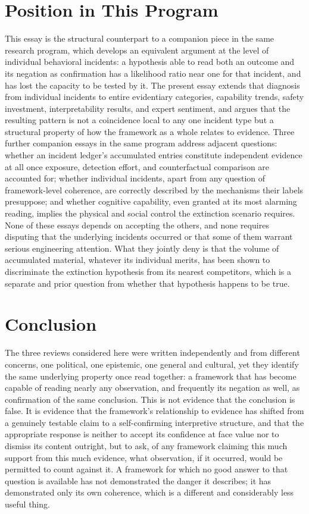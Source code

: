 \documentclass[11pt]{article}
\begin{document}
\section{Position in This Program}

This essay is the structural counterpart to a companion piece in the same research program, which develops an equivalent argument at the level of individual behavioral incidents: a hypothesis able to read both an outcome and its negation as confirmation has a likelihood ratio near one for that incident, and has lost the capacity to be tested by it. The present essay extends that diagnosis from individual incidents to entire evidentiary categories, capability trends, safety investment, interpretability results, and expert sentiment, and argues that the resulting pattern is not a coincidence local to any one incident type but a structural property of how the framework as a whole relates to evidence. Three further companion essays in the same program address adjacent questions: whether an incident ledger's accumulated entries constitute independent evidence at all once exposure, detection effort, and counterfactual comparison are accounted for; whether individual incidents, apart from any question of framework-level coherence, are correctly described by the mechanisms their labels presuppose; and whether cognitive capability, even granted at its most alarming reading, implies the physical and social control the extinction scenario requires. None of these essays depends on accepting the others, and none requires disputing that the underlying incidents occurred or that some of them warrant serious engineering attention. What they jointly deny is that the volume of accumulated material, whatever its individual merits, has been shown to discriminate the extinction hypothesis from its nearest competitors, which is a separate and prior question from whether that hypothesis happens to be true.

\section{Conclusion}

The three reviews considered here were written independently and from different concerns, one political, one epistemic, one general and cultural, yet they identify the same underlying property once read together: a framework that has become capable of reading nearly any observation, and frequently its negation as well, as confirmation of the same conclusion. This is not evidence that the conclusion is false. It is evidence that the framework's relationship to evidence has shifted from a genuinely testable claim to a self-confirming interpretive structure, and that the appropriate response is neither to accept its confidence at face value nor to dismiss its content outright, but to ask, of any framework claiming this much support from this much evidence, what observation, if it occurred, would be permitted to count against it. A framework for which no good answer to that question is available has not demonstrated the danger it describes; it has demonstrated only its own coherence, which is a different and considerably less useful thing.
\end{document}
